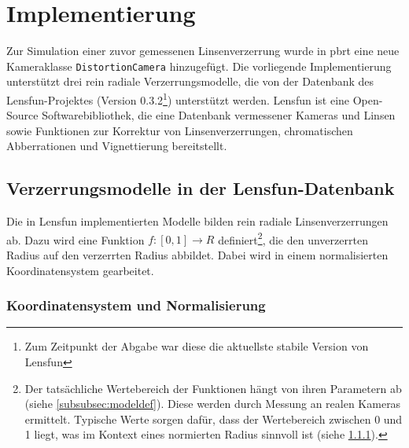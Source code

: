 \section{Implementierung}

Zur Simulation einer zuvor gemessenen Linsenverzerrung wurde in pbrt eine neue Kameraklasse \texttt{DistortionCamera} hinzugefügt. Die vorliegende Implementierung unterstützt drei rein radiale Verzerrungsmodelle, die von der Datenbank des Lensfun-Projektes\cite{lensfun_basic} (Version 0.3.2\footnote{Zum Zeitpunkt der Abgabe war diese die aktuellste stabile Version von Lensfun}) unterstützt werden. Lensfun ist eine Open-Source Softwarebibliothek, die eine Datenbank vermessener Kameras und Linsen sowie Funktionen zur Korrektur von Linsenverzerrungen, chromatischen Abberrationen und Vignettierung bereitstellt.

\subsection{Verzerrungsmodelle in der Lensfun-Datenbank}

Die in Lensfun implementierten Modelle bilden rein radiale Linsenverzerrungen ab. Dazu wird eine Funktion $f:[0,1] \rightarrow R$ definiert\footnote{Der tatsächliche Wertebereich der Funktionen hängt von ihren Parametern ab (siehe \ref{subsubsec:modeldef}). Diese werden durch Messung an realen Kameras ermittelt. Typische Werte sorgen dafür, dass der Wertebereich zwischen 0 und 1 liegt, was im Kontext eines normierten Radius sinnvoll ist (siehe \ref{subsubsec:norm_radius}).}, die den unverzerrten Radius auf den verzerrten Radius abbildet. Dabei wird in einem normalisierten Koordinatensystem gearbeitet.

\subsubsection{Koordinatensystem und Normalisierung}
\label{subsubsec:norm_radius}

